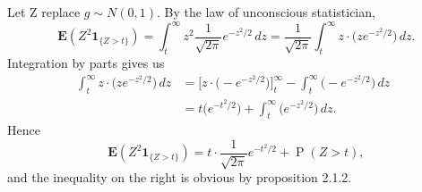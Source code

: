 \documentclass[11pt]{article}
\renewcommand{\Pr}{\operatorname{P}}
\newcommand{\E}{\mathop{}\!\mathbf{E}}
\newcommand{\I}[1]{\mathbf{1}_{\{#1\}}}
\theoremstyle{plain}
\theoremstyle{definition}
\theoremstyle{remark}
\theoremstyle{definition}
\newenvironment{mansol}[1]{%
  \renewcommand\themansolinner{#1}%
  \mansolinner
}{\endmansolinner}
\begin{document}
\begin{mansol}{2.1.4}
Let Z replace $g \sim N(0,1)$. By the law of unconscious statistician, 
\[
\E(Z^2 \I{Z > t}) = \int_t^\infty z^2 \frac{1}{\sqrt{2\pi}} e^{-z^2 / 2}\,dz 
= \frac{1}{\sqrt{2\pi}}\int_t^\infty z \cdot \bigl(z e^{-z^2 / 2}\bigr)\,dz.
\]
Integration by parts gives us \begin{align*}
\int_t^\infty z \cdot \bigl(z e^{-z^2 / 2}\bigr)\,dz & = \bigl[z \cdot \bigl(- e^{-z^2 / 2}\bigr)\bigr]_t^\infty - \int_t^\infty \bigl(- e^{-z^2/2}\bigr)\,dz \\
& = t \bigl(e^{-t^2 / 2}\bigr) + \int_t^\infty \bigl(e^{-z^2/2}\bigr)\,dz.
\end{align*}
Hence \[
\E(Z^2 \I{Z > t}) = t \cdot \frac{1}{\sqrt{2\pi}} e^{-t^2/2} + \Pr(Z > t),
\] and the inequality on the right is obvious by proposition 2.1.2.
\end{mansol}
\end{document}
